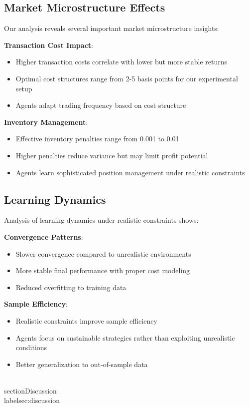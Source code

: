 \documentclass[11pt,a4paper]{article}
\begin{document}
\subsection{Market Microstructure Effects}

Our analysis reveals several important market microstructure insights:

\textbf{Transaction Cost Impact}:
\begin{itemize}
\item Higher transaction costs correlate with lower but more stable returns
\item Optimal cost structures range from 2-5 basis points for our experimental setup
\item Agents adapt trading frequency based on cost structure
\end{itemize}

\textbf{Inventory Management}:
\begin{itemize}
\item Effective inventory penalties range from 0.001 to 0.01
\item Higher penalties reduce variance but may limit profit potential
\item Agents learn sophisticated position management under realistic constraints
\end{itemize}

\subsection{Learning Dynamics}

Analysis of learning dynamics under realistic constraints shows:

\textbf{Convergence Patterns}:
\begin{itemize}
\item Slower convergence compared to unrealistic environments
\item More stable final performance with proper cost modeling
\item Reduced overfitting to training data
\end{itemize}

\textbf{Sample Efficiency}:
\begin{itemize}
\item Realistic constraints improve sample efficiency
\item Agents focus on sustainable strategies rather than exploiting unrealistic conditions
\item Better generalization to out-of-sample data
\end{itemize}
\n\n
\\section{Discussion}
\\label{sec:discussion}
\end{document}
